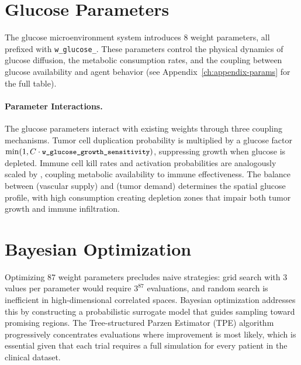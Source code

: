 \section{Glucose Parameters}
\label{sec:glucose-params}

The glucose microenvironment system introduces 8 weight parameters, all prefixed with \texttt{w\_glucose\_}. These parameters control the physical dynamics of glucose diffusion, the metabolic consumption rates, and the coupling between glucose availability and agent behavior (see Appendix~\ref{ch:appendix-params} for the full table).

\paragraph{Parameter Interactions.}

The glucose parameters interact with existing weights through three coupling mechanisms. Tumor cell duplication probability is multiplied by a glucose factor $\min(1, C \cdot \texttt{\small w\_glucose\_\allowbreak growth\_sensitivity})$, suppressing growth when glucose is depleted. Immune cell kill rates and activation probabilities are analogously scaled by , coupling metabolic availability to immune effectiveness. The balance between  (vascular supply) and  (tumor demand) determines the spatial glucose profile, with high consumption creating depletion zones that impair both tumor growth and immune infiltration.

\section{Bayesian Optimization}
\label{sec:bayesian-optimization}

Optimizing 87 weight parameters precludes naive strategies: grid search with 3 values per parameter would require $3^{87}$ evaluations, and random search is inefficient in high-dimensional correlated spaces. Bayesian optimization addresses this by constructing a probabilistic surrogate model that guides sampling toward promising regions. The Tree-structured Parzen Estimator (TPE) algorithm progressively concentrates evaluations where improvement is most likely, which is essential given that each trial requires a full simulation for every patient in the clinical dataset.

